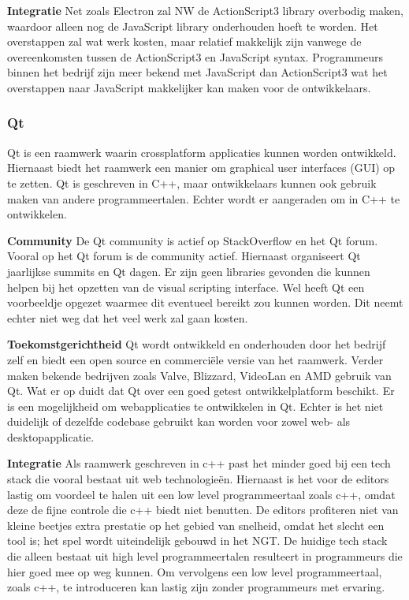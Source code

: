 \textbf{Integratie}
Net zoals Electron zal NW de ActionScript3 library overbodig maken, waardoor alleen nog de JavaScript library onderhouden hoeft te worden. Het overstappen zal wat werk kosten, maar relatief makkelijk zijn vanwege de overeenkomsten tussen de ActionScript3 en JavaScript syntax.
Programmeurs binnen het bedrijf zijn meer bekend met JavaScript dan ActionScript3 wat het overstappen naar JavaScript makkelijker kan maken voor de ontwikkelaars.

\subsubsection{Qt}
Qt is een raamwerk waarin crossplatform applicaties kunnen worden ontwikkeld. Hiernaast biedt het raamwerk een manier om graphical user interfaces (GUI) op te zetten\cite{Qt}. Qt is geschreven in C++, maar ontwikkelaars kunnen ook gebruik maken van andere programmeertalen\cite{QtLanguageBindings}. Echter wordt er aangeraden om in C++ te ontwikkelen.

\textbf{Community}
De Qt community is actief op StackOverflow\cite{StackOverflowQtQuestions} en het Qt forum\cite{QtForum}. Vooral op het Qt forum is de community actief. Hiernaast organiseert Qt jaarlijkse summits en Qt dagen.  
Er zijn geen libraries gevonden die kunnen helpen bij het opzetten van de visual scripting interface. Wel heeft Qt een voorbeeldje opgezet waarmee dit eventueel bereikt zou kunnen worden\cite{QtDiagramExample}. Dit neemt echter niet weg dat het veel werk zal gaan kosten.

\textbf{Toekomstgerichtheid}
Qt wordt ontwikkeld en onderhouden door het bedrijf zelf en biedt een open source en commerciële versie van het raamwerk\cite{QtLicense}. Verder maken bekende bedrijven zoals Valve\cite{ValveQt}, Blizzard\cite{BlizzardQt}, VideoLan\cite{VideoLanQt} en AMD\cite{AMDQt} gebruik van Qt. Wat er op duidt dat Qt over een goed getest ontwikkelplatform beschikt.
Er is een mogelijkheid om webapplicaties te ontwikkelen in Qt\cite{QtWebKit}\cite{QtCutelyst}\cite{WtQt}. Echter is het niet duidelijk of dezelfde codebase gebruikt kan worden voor zowel web- als desktopapplicatie.

\textbf{Integratie}
Als raamwerk geschreven in c++ past het minder goed bij een tech stack die vooral bestaat uit web technologieën. Hiernaast is het voor de editors lastig om voordeel te halen uit een low level programmeertaal zoals c++, omdat deze de fijne controle die c++ biedt niet benutten. De editors profiteren niet van kleine beetjes extra prestatie op het gebied van snelheid, omdat het slecht een tool is; het spel wordt uiteindelijk gebouwd in het NGT.
De huidige tech stack die alleen bestaat uit high level programmeertalen resulteert in programmeurs die hier goed mee op weg kunnen. Om vervolgens een low level programmeertaal, zoals c++, te introduceren kan lastig zijn zonder programmeurs met ervaring.


